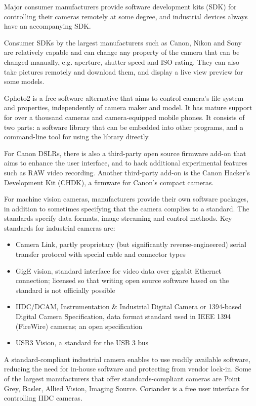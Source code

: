 Major consumer manufacturers provide software development kits (SDK) for controlling their cameras remotely at some degree, and industrial devices always have an accompanying SDK.

Consumer SDKs by the largest manufacturers such as Canon, Nikon and Sony are relatively capable and can change any property of the camera that can be changed manually, e.g. aperture, shutter speed and ISO rating.
They can also take pictures remotely and download them, and display a live view preview for some models.

Gphoto2 is a free software alternative that aims to control camera's file system and properties, independently of camera maker and model.
It has mature support for over a thousand cameras and camera-equipped mobile phones.
It consists of two parts: a software library that can be embedded into other programs, and a command-line tool for using the library directly.

For Canon DSLRs, there is also a third-party open source firmware add-on that aims to enhance the user interface, and to hack additional experimental features such as RAW video recording.
Another third-party add-on is the Canon Hacker's Development Kit (CHDK), a firmware for Canon's compact cameras.

For machine vision cameras, manufacturers provide their own software packages, in addition to sometimes specifying that the camera complies to a standard.
The standards specify data formats, image streaming and control methods.
Key standards for industrial cameras are:

\begin{itemize}
	\item Camera Link, partly proprietary (but significantly reverse-engineered) serial transfer protocol with special cable and connector types
	\item GigE vision, standard interface for video data over gigabit Ethernet connection; licensed so that writing open source software based on the standard is not officially possible
	\item IIDC/DCAM, Instrumentation \& Industrial Digital Camera or 1394-based Digital Camera Specification, data format standard used in IEEE 1394 (FireWire) cameras; an open specification
	\item USB3 Vision, a standard for the USB 3 bus
\end{itemize}

A standard-compliant industrial camera enables to use readily available software, reducing the need for in-house software and protecting from vendor lock-in.
Some of the largest manufacturers that offer standards-compliant cameras are Point Grey, Basler, Allied Vision, Imaging Source.
Coriander \cite{coriander} is a free user interface for controlling IIDC cameras.

